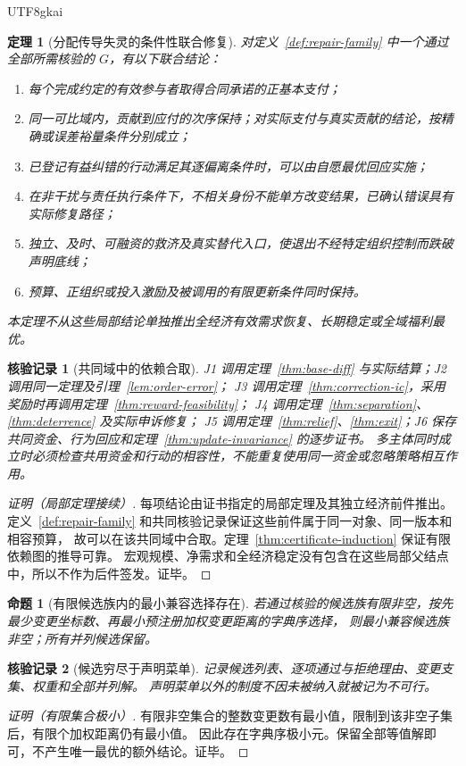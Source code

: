 \documentclass[12pt,a4paper,openany]{report}
\newtheorem{theorem}{定理}[chapter]
\newtheorem{proposition}{命题}[chapter]
\newtheorem{Certificate}{核验记录}[chapter]
\begin{document}
\begin{CJK*}{UTF8}{gkai}
\begin{theorem}[分配传导失灵的条件性联合修复]
\label{thm:joint-repair}
对定义~\ref{def:repair-family} 中一个通过全部所需核验的 $G$，有以下联合结论：
\begin{enumerate}[label=\textup{(J\arabic*)},leftmargin=4em]
\item 每个完成约定的有效参与者取得合同承诺的正基本支付；
\item 同一可比域内，贡献到应付的次序保持；对实际支付与真实贡献的结论，按精确或误差裕量条件分别成立；
\item 已登记有益纠错的行动满足其逐偏离条件时，可以由自愿最优回应实施；
\item 在非干扰与责任执行条件下，不相关身份不能单方改变结果，已确认错误具有实际修复路径；
\item 独立、及时、可融资的救济及真实替代入口，使退出不经特定组织控制而跌破声明底线；
\item 预算、正组织或投入激励及被调用的有限更新条件同时保持。
\end{enumerate}
本定理不从这些局部结论单独推出全经济有效需求恢复、长期稳定或全域福利最优。
\end{theorem}
\begin{Certificate}[共同域中的依赖合取]
J1 调用定理~\ref{thm:base-diff} 与实际结算；J2 调用同一定理及引理~\ref{lem:order-error}；
J3 调用定理~\ref{thm:correction-ic}，采用奖励时再调用定理~\ref{thm:reward-feasibility}；
J4 调用定理~\ref{thm:separation}、\ref{thm:deterrence} 及实际申诉修复；
J5 调用定理~\ref{thm:relief}、\ref{thm:exit}；J6 保存共同资金、行为回应和定理~\ref{thm:update-invariance} 的逐步证书。
多主体同时成立时必须检查共用资金和行动的相容性，不能重复使用同一资金或忽略策略相互作用。
\end{Certificate}
\begin{proof}[证明（局部定理接续）]
每项结论由证书指定的局部定理及其独立经济前件推出。
定义~\ref{def:repair-family} 和共同核验记录保证这些前件属于同一对象、同一版本和相容预算，
故可以在该共同域中合取。定理~\ref{thm:certificate-induction} 保证有限依赖图的推导可靠。
宏观规模、净需求和全经济稳定没有包含在这些局部父结点中，所以不作为后件签发。证毕。
\end{proof}

\begin{proposition}[有限候选族内的最小兼容选择存在]
\label{prop:minimal-compatible}
若通过核验的候选族有限非空，按先最少变更坐标数、再最小预注册加权变更距离的字典序选择，
则最小兼容候选族非空；所有并列候选保留。
\end{proposition}
\begin{Certificate}[候选穷尽于声明菜单]
记录候选列表、逐项通过与拒绝理由、变更支集、权重和全部并列解。
声明菜单以外的制度不因未被纳入就被记为不可行。
\end{Certificate}
\begin{proof}[证明（有限集合极小）]
有限非空集合的整数变更数有最小值，限制到该非空子集后，有限个加权距离仍有最小值。
因此存在字典序极小元。保留全部等值解即可，不产生唯一最优的额外结论。证毕。
\end{proof}


\end{CJK*}
\end{document}
